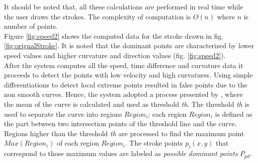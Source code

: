 \documentclass[a4paper,10pt]{IEEEconf}
\begin{document}
 It should be noted that, all these calculations are performed in real time while the user draws the strokes. The complexity of computation is $O(n)$ where $n$ is number of points. \\
 Figure \ref{fig:speed2} shows the computed data for the stroke drawn in fig. \ref{fig:orignalStroke}. %
 It is noted that the dominant points are characterized by lower speed values and higher curvature and direction values (fig. \ref{fig:speed2}). \\%
After the system computes all the speed, time difference and curvature data it proceeds to detect the points with low velocity and high curvatures. Using simple differentiations to detect local extreme points resulted in false points due to the non smooth curves. Hence, the system adopted a process presented by \cite{earlyprocess}, where the mean
of the curve is calculated and used as threshold \textit{th}. The threshold \textit{th} is used to separate the curve into regions  $Region_i$; each region $Region_i$ is defined as the part between two intersection points of the threshold line and the curve. Regions higher than the threshold \textit{th} are processed to find the maximum point $Max(Region_i)$ of each region $Region_i$. The stroke points $p_i(x,y)$ that correspond to those maximum values are labeled as \textit{possible dominant points} $P_{pd}$.   \\
\end{document}
